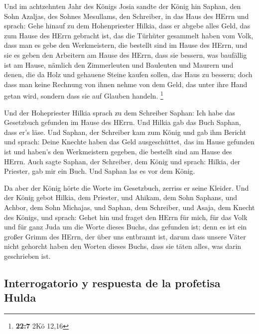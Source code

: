  Und im achtzehnten Jahr des Königs Josia sandte der König
hin Saphan, den Sohn Azaljas, des Sohnes Mesullams, den Schreiber, in
das Haus des HErrn und sprach:  Gehe hinauf zu dem
Hohenpriester Hilkia, dass er abgebe alles Geld, das zum Hause des HErrn
gebracht ist, das die Türhüter gesammelt haben vom Volk, 
dass man es gebe den Werkmeistern, die bestellt sind im Hause des HErrn,
und sie es geben den Arbeitern am Hause des HErrn, dass sie bessern, was
baufällig ist am Hause,  nämlich den Zimmerleuten und
Bauleuten und Maurern und denen, die da Holz und gehauene Steine kaufen
sollen, das Haus zu bessern;  doch dass man keine Rechnung
von ihnen nehme von dem Geld, das unter ihre Hand getan wird, sondern
dass sie auf Glauben handeln. \footnote{\textbf{22:7} 2Kö 12,16}

 Und der Hohepriester Hilkia sprach zu dem Schreiber
Saphan: Ich habe das Gesetzbuch gefunden im Hause des HErrn. Und Hilkia
gab das Buch Saphan, dass er's läse.  Und Saphan, der
Schreiber kam zum König und gab ihm Bericht und sprach: Deine Knechte
haben das Geld ausgeschüttet, das im Hause gefunden ist und haben's den
Werkmeistern gegeben, die bestellt sind am Hause des HErrn.
 Auch sagte Saphan, der Schreiber, dem König und sprach:
Hilkia, der Priester, gab mir ein Buch. Und Saphan las es vor dem König.

 Da aber der König hörte die Worte im Gesetzbuch, zerriss
er seine Kleider.  Und der König gebot Hilkia, dem
Priester, und Ahikam, dem Sohn Saphans, und Achbor, dem Sohn Michajas,
und Saphan, dem Schreiber, und Asaja, dem Knecht des Königs, und sprach:
 Gehet hin und fraget den HErrn für mich, für das Volk
und für ganz Juda um die Worte dieses Buchs, das gefunden ist; denn es
ist ein großer Grimm des HErrn, der über uns entbrannt ist, darum dass
unsere Väter nicht gehorcht haben den Worten dieses Buchs, dass sie
täten alles, was darin geschrieben ist.

\hypertarget{interrogatorio-y-respuesta-de-la-profetisa-hulda}{%
\subsection{Interrogatorio y respuesta de la profetisa
Hulda}\label{interrogatorio-y-respuesta-de-la-profetisa-hulda}}

